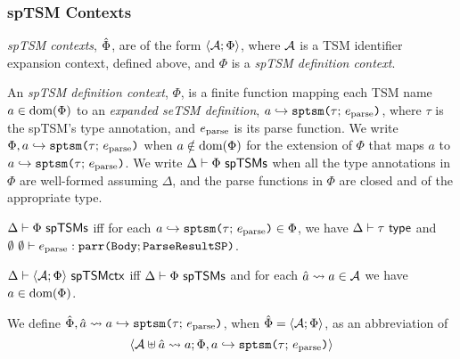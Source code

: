 \begin{grayparbox}\vspace{-15px}\subsubsection{spTSM Contexts}
\emph{spTSM contexts}, $\hat\Phi$, are of the form $\langle \mathcal{A}; \Phi \rangle$, where $\mathcal{A}$ is a {TSM identifier expansion context}, defined above, and $\Phi$ is a \emph{spTSM definition context}. 

An \emph{spTSM definition context}, $\Phi$, is a finite function mapping each TSM name $a \in \text{dom}(\Phi)$ to an \emph{expanded seTSM definition}, $a \hookrightarrow \texttt{sptsm}\texttt{(}\tau;\,e_\text{parse}\texttt{)}$, where $\tau$ is the spTSM's type annotation, and $e_\text{parse}$ is its parse function. We write $\Phi, a \hookrightarrow \texttt{sptsm}\texttt{(}\tau;\,e_\text{parse}\texttt{)}$ when $a \notin \text{dom}(\Phi)$ for the extension of $\Phi$ that maps $a$ to $a \hookrightarrow \texttt{sptsm}\texttt{(}\tau;\,e_\text{parse}\texttt{)}$. We write $\Delta \vdash \Phi~\mathsf{spTSMs}$  when all the type annotations in $\Phi$ are well-formed assuming $\Delta$, and the parse functions in $\Phi$ are closed and of the appropriate type.

\begin{definition}\label{def:spTSM-def-ctx-formation} $\Delta \vdash \Phi~\mathsf{spTSMs}$ iff for each $a \hookrightarrow \texttt{sptsm}\texttt{(}\tau;\,e_\text{parse}\texttt{)} \in \Phi$, we have $\Delta \vdash \tau~\mathsf{type}$ and $\emptyset~\emptyset \vdash e_\text{parse} : \texttt{parr}\texttt{(}\mathtt{Body}; \mathtt{ParseResultSP}\texttt{)}$.\end{definition}

\begin{definition} $\Delta \vdash \langle \mathcal{A}; \Phi \rangle~\mathsf{spTSMctx}$ iff $\Delta \vdash \Phi~\mathsf{spTSMs}$ and for each $\hat{a} \leadsto a \in \mathcal{A}$ we have $a \in \text{dom}(\Phi)$.
\end{definition}

We define $\hat\Phi, \hat{a} \leadsto a \hookrightarrow \texttt{sptsm}\texttt{(}\tau;\,e_\text{parse}\texttt{)}$, when $\hat\Phi=\langle \mathcal{A}; \Phi \rangle$, as an abbreviation of \[\langle \mathcal{A} \uplus \hat{a} \leadsto a; \Phi, a \hookrightarrow \texttt{sptsm}\texttt{(}\tau;\,e_\text{parse}\texttt{)} \rangle\]
\end{grayparbox}

